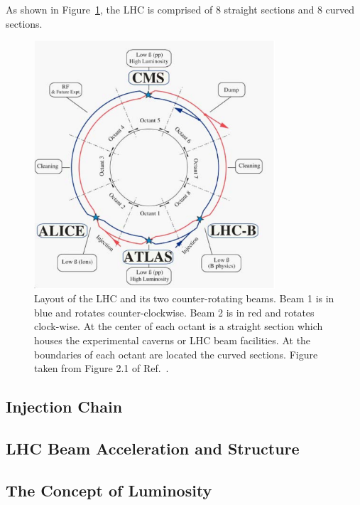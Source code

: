 As shown in Figure~\ref{fig:lhc_layout}, the LHC is comprised of 8 straight sections and 8 curved sections.

\begin{figure}[!htb]
    \begin{center}
        \includegraphics[width=0.8\textwidth]{figures/chapter2/lhc_layout}
        \caption{
            Layout of the LHC and its two counter-rotating beams. Beam 1 is in blue and rotates
            counter-clockwise. Beam 2 is in red and rotates clock-wise.
            At the center of each octant is a straight section which houses
            the experimental caverns or LHC beam facilities.
            At the boundaries of each octant are located the curved sections.
            Figure taken from Figure 2.1 of Ref.~\cite{LHCMachine}.
            {\color{red}{Somewhere $\beta$ should be described -- betatron function}}
        }
        \label{fig:lhc_layout}
    \end{center}
\end{figure}

\FloatBarrier
\subsection{Injection Chain}
\label{sec:lhc_injection}

\subsection{LHC Beam Acceleration and Structure}
\label{sec:lhc_acceleration}

\subsection{The Concept of Luminosity}
\label{sec:lhc_luminosity}

{\color{red}{tabulated design parameters of LHC}}
